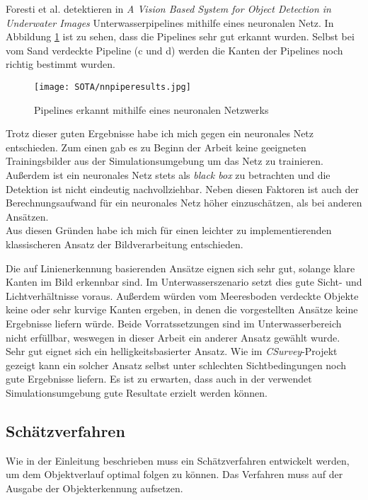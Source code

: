 Foresti et al. detektieren in \textit{A Vision Based System for Object Detection in
Underwater Images} Unterwasserpipelines mithilfe eines neuronalen Netz. In Abbildung \ref{nnDet} ist zu sehen, dass die Pipelines sehr gut erkannt wurden. Selbst bei vom Sand verdeckte Pipeline (c und d) werden die Kanten der Pipelines noch richtig bestimmt wurden.

\begin{figure}[H]
\centering
\texttt{[image: SOTA/nnpiperesults.jpg]}
\caption{Pipelines erkannt mithilfe eines neuronalen Netzwerks}
\label{nnDet}
\end{figure}
Trotz dieser guten Ergebnisse habe ich mich gegen ein neuronales Netz entschieden. Zum einen gab es zu Beginn der Arbeit keine geeigneten Trainingsbilder aus der Simulationsumgebung um das Netz zu trainieren. Außerdem ist ein neuronales Netz stets als \textit{black box} zu betrachten und die Detektion ist nicht eindeutig nachvollziehbar. Neben diesen Faktoren ist auch der Berechnungsaufwand für ein neuronales Netz höher einzuschätzen, als bei anderen Ansätzen.\\
Aus diesen Gründen habe ich mich für einen leichter zu implementierenden klassischeren Ansatz der Bildverarbeitung entschieden.

Die auf Linienerkennung basierenden Ansätze eignen sich sehr gut, solange klare Kanten im Bild erkennbar sind. Im Unterwasserszenario setzt dies gute Sicht- und Lichtverhältnisse voraus. Außerdem würden vom Meeresboden verdeckte Objekte keine oder sehr kurvige Kanten ergeben, in denen die vorgestellten Ansätze keine Ergebnisse liefern würde. Beide Vorratssetzungen sind im Unterwasserbereich nicht erfüllbar, weswegen in dieser Arbeit ein anderer Ansatz gewählt wurde.\\
Sehr gut eignet sich ein helligkeitsbasierter Ansatz. Wie im \textit{CSurvey}-Projekt\cite{Albiez2015CSurveyA} gezeigt kann ein solcher Ansatz selbst unter schlechten Sichtbedingungen noch gute Ergebnisse liefern. Es ist zu erwarten, dass auch in der verwendet Simulationsumgebung gute Resultate erzielt werden können.\\
\subsection{Schätzverfahren}
Wie in der Einleitung beschrieben muss ein Schätzverfahren entwickelt werden, um dem Objektverlauf optimal folgen zu können. Das Verfahren muss auf der Ausgabe der Objekterkennung aufsetzen.
